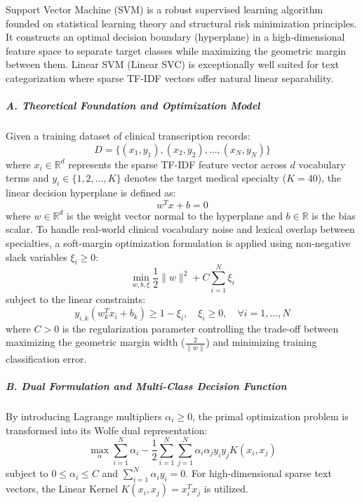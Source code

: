 Support Vector Machine (SVM) is a robust supervised learning algorithm founded on statistical learning theory and structural risk minimization principles. It constructs an optimal decision boundary (hyperplane) in a high-dimensional feature space to separate target classes while maximizing the geometric margin between them. Linear SVM (Linear SVC) is exceptionally well suited for text categorization where sparse TF-IDF vectors offer natural linear separability.

\subparagraph{A. Theoretical Foundation and Optimization Model}
Given a training dataset of clinical transcription records:
\begin{equation}
D = \{(x_1, y_1), (x_2, y_2), \dots, (x_N, y_N)\}
\end{equation}
where $x_i \in \mathbb{R}^d$ represents the sparse TF-IDF feature vector across $d$ vocabulary terms and $y_i \in \{1, 2, \dots, K\}$ denotes the target medical specialty ($K = 40$), the linear decision hyperplane is defined as:
\begin{equation}
w^T x + b = 0
\end{equation}
where $w \in \mathbb{R}^d$ is the weight vector normal to the hyperplane and $b \in \mathbb{R}$ is the bias scalar. To handle real-world clinical vocabulary noise and lexical overlap between specialties, a soft-margin optimization formulation is applied using non-negative slack variables $\xi_i \ge 0$:
\begin{equation}
\min_{w, b, \xi} \frac{1}{2} \|w\|^2 + C \sum_{i=1}^{N} \xi_i
\end{equation}
subject to the linear constraints:
\begin{equation}
y_{i, k}(w_k^T x_i + b_k) \ge 1 - \xi_i, \quad \xi_i \ge 0, \quad \forall i = 1, \dots, N
\end{equation}
where $C > 0$ is the regularization parameter controlling the trade-off between maximizing the geometric margin width ($\frac{2}{\|w\|}$) and minimizing training classification error.

\subparagraph{B. Dual Formulation and Multi-Class Decision Function}
By introducing Lagrange multipliers $\alpha_i \ge 0$, the primal optimization problem is transformed into its Wolfe dual representation:
\begin{equation}
\max_{\alpha} \sum_{i=1}^{N} \alpha_i - \frac{1}{2} \sum_{i=1}^{N} \sum_{j=1}^{N} \alpha_i \alpha_j y_i y_j K(x_i, x_j)
\end{equation}
subject to $0 \le \alpha_i \le C$ and $\sum_{i=1}^{N} \alpha_i y_i = 0$. For high-dimensional sparse text vectors, the Linear Kernel $K(x_i, x_j) = x_i^T x_j$ is utilized.

